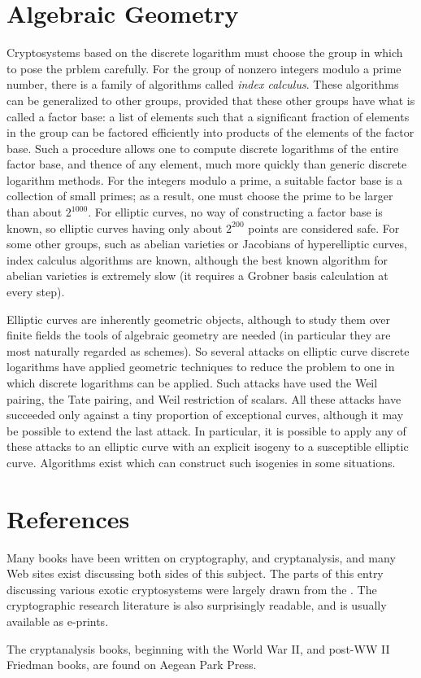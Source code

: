 \documentclass[12pt]{article}
\begin{document}
\section*{Algebraic Geometry}

Cryptosystems based on the discrete logarithm must choose the group in which to pose the prblem carefully. For the group of nonzero integers modulo a prime number, there is a family of algorithms called \emph{index calculus}.  These algorithms can be generalized to other groups, provided that these other groups have what is called a factor base: a list of elements such that a significant fraction of elements in the group can be factored efficiently into products of the elements of the factor base.  Such a procedure allows one to compute discrete logarithms of the entire factor base, and thence of any element, much more quickly than generic discrete logarithm methods. For the integers modulo a prime, a suitable factor base is a collection of small primes; as a result, one must choose the prime to be larger than about $2^{1000}$. For elliptic curves, no way of constructing a factor base is known, so elliptic curves having only about $2^{200}$ points are considered safe. For some other groups, such as abelian varieties or Jacobians of hyperelliptic curves, index calculus algorithms are known, although the best known algorithm for abelian varieties is extremely slow (it requires a Grobner basis calculation at every step).

Elliptic curves are inherently geometric objects, although to study them over finite fields the tools of algebraic geometry are needed (in particular they are most naturally regarded as schemes).  So several attacks on elliptic curve discrete logarithms have applied geometric techniques to reduce the problem to one in which discrete logarithms can be applied. Such attacks have used the Weil pairing, the Tate pairing, and Weil restriction of scalars. All these attacks have succeeded only against a tiny proportion of exceptional curves, although it may be possible to extend the last attack.  In particular, it is possible to apply any of these attacks to an elliptic curve with an explicit isogeny to a susceptible elliptic curve. Algorithms exist which can construct such isogenies in some situations.

\section*{References}

Many books have been written on cryptography, and cryptanalysis, and many Web sites exist discussing both sides of this subject. The parts of this entry discussing various exotic cryptosystems were largely drawn from the .  The cryptographic research literature is also surprisingly readable, and is usually available as e-prints.

The cryptanalysis books, beginning with the World War II, and post-WW II Friedman books, are found on Aegean Park Press.
\end{document}
